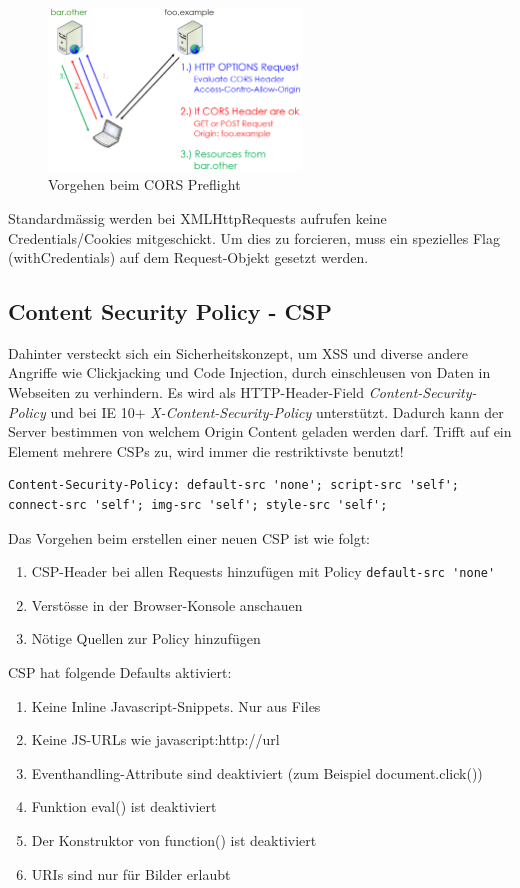\begin{figure}[H]
	\centering
	\includegraphics[width=0.6\textwidth]{./img/cors-preflight}
	\caption{Vorgehen beim CORS Preflight}
\end{figure}

Standardmässig werden bei XMLHttpRequests aufrufen keine Credentials/Cookies mitgeschickt. Um dies zu forcieren, muss ein spezielles Flag (withCredentials) auf dem Request-Objekt gesetzt werden.

\subsection{Content Security Policy - CSP}
Dahinter versteckt sich ein Sicherheitskonzept, um XSS und diverse andere Angriffe wie Clickjacking und Code Injection, durch einschleusen von Daten in Webseiten zu verhindern. Es wird als HTTP-Header-Field \textit{Content-Security-Policy} und bei IE 10+ \textit{X-Content-Security-Policy} unterstützt.
Dadurch kann der Server bestimmen von welchem Origin Content geladen werden darf. Trifft auf ein Element mehrere CSPs zu, wird immer die restriktivste benutzt!

\begin{lstlisting}[caption=Starter Policy für CSP-Header, language={}]
Content-Security-Policy: default-src 'none'; script-src 'self'; connect-src 'self'; img-src 'self'; style-src 'self';
\end{lstlisting}

Das Vorgehen beim erstellen einer neuen CSP ist wie folgt:
\begin{enumerate}
	\item CSP-Header bei allen Requests hinzufügen mit Policy \lstinline[language=clean]|default-src 'none'|
	\item Verstösse in der Browser-Konsole anschauen
	\item Nötige Quellen zur Policy hinzufügen
\end{enumerate}

CSP hat folgende Defaults aktiviert:
\begin{enumerate}
	\item Keine Inline Javascript-Snippets. Nur aus Files 
	\item Keine JS-URLs wie javascript:http://url
	\item Eventhandling-Attribute sind deaktiviert (zum Beispiel document.click())
	\item Funktion eval() ist deaktiviert
	\item Der Konstruktor von function() ist deaktiviert
	\item URIs sind nur für Bilder erlaubt
\end{enumerate}

